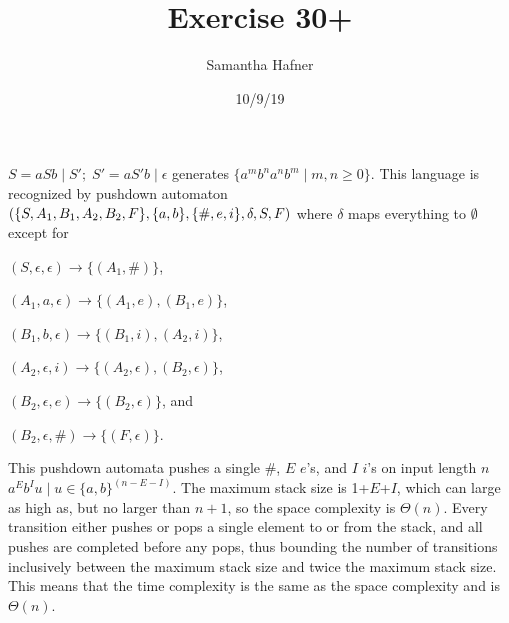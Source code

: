 \documentclass[12pt]{article}
\title{Exercise 30+}
\author{Samantha Hafner}
\date{10/9/19}
\begin{document}
\maketitle


$S = aSb\;\vert\;S';\;S' = aS'b\;\vert\;\epsilon$ generates $\{a^m b^n a^n b^m\;|\;m,n\ge0\}$.
This language is recognized by pushdown automaton $(\{S, A_1, B_1, A_2, B_2, F\}, \{a, b\}, \\\{\#, e, i\}, \delta, S, F)$
where $\delta$ maps everything to $\emptyset$ except for

$(S,\epsilon,\epsilon) \rightarrow \{(A_1, \#)\}$,

$(A_1,a,\epsilon) \rightarrow \{(A_1, e), (B_1, e)\}$,

$(B_1,b,\epsilon) \rightarrow \{(B_1, i), (A_2, i)\}$,

$(A_2,\epsilon,i) \rightarrow \{(A_2, \epsilon), (B_2, \epsilon)\}$,

$(B_2,\epsilon,e) \rightarrow \{(B_2, \epsilon)\}$, and

$(B_2,\epsilon,\#) \rightarrow \{(F, \epsilon)\}$.

This pushdown automata pushes a single $\#$, $E$ $e$'s, and $I$ $i$'s on input length $n$ $a^Eb^Iu\;|\;u\in\{a,b\}^{(n-E-I)}$. The maximum stack size is 1+$E$+$I$, which can large as high as, but no larger than $n+1$, so the space complexity is $\Theta(n)$. Every transition either pushes or pops a single element to or from the stack, and all pushes are completed before any pops, thus bounding the number of transitions inclusively between the maximum stack size and twice the maximum stack size. This means that the time complexity is the same as the space complexity and is $\Theta(n)$.
\end{document}
